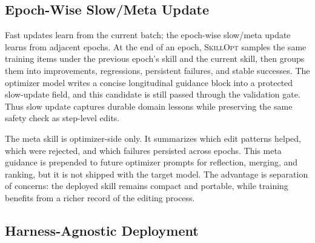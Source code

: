 \documentclass[
]{article}
\newcommand{\ourmethod}{\textsc{SkillOpt}\xspace}
\begin{document}
\begin{table}[!htbp]
\caption{Main results on held-out test splits. Scores are percentages; within each model--harness block, bold marks the best measured entry and underlining marks the second-best entry for each benchmark. Blue cells denote \ourmethod{}, and small green/red subscripts show the absolute change relative to the \emph{No skill} row of the same model in the same harness. We omit ALFWorld under Codex and Claude Code harnesses because ALFWorld requires persistent embodied-environment interaction. \ourmethod{} is the best-or-tied entry on every measured cell of the table, with positive gains over the no-skill baseline throughout.}
\label{tab-main-results-by-harness}
\end{table}

\subsection{Epoch-Wise Slow/Meta Update}\label{sec-method-slow-meta}

Fast updates learn from the current batch; the epoch-wise slow/meta
update learns from adjacent epochs. At the end of an epoch, \ourmethod{}
samples the same training items under the previous epoch's skill and the
current skill, then groups them into improvements, regressions,
persistent failures, and stable successes. The optimizer model writes a
concise longitudinal guidance block into a protected slow-update field,
and this candidate is still passed through the validation gate. Thus
slow update captures durable domain lessons while preserving the same
safety check as step-level edits.

The meta skill is optimizer-side only. It summarizes which edit patterns
helped, which were rejected, and which failures persisted across epochs.
This meta guidance is prepended to future optimizer prompts for
reflection, merging, and ranking, but it is not shipped with the target
model. The advantage is separation of concerns: the deployed skill
remains compact and portable, while training benefits from a richer
record of the editing process.

\subsection{Harness-Agnostic Deployment}\label{sec-method-harness}
\end{document}
